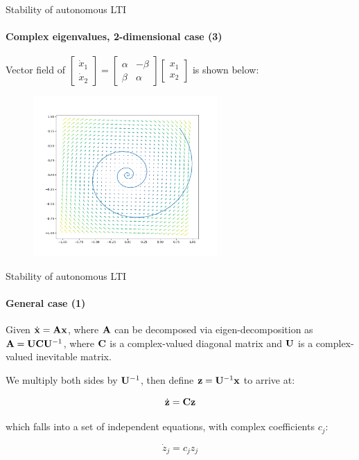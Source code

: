 \documentclass{beamer}
\begin{document}
\begin{frame}{Stability of autonomous LTI}
\framesubtitle{Complex eigenvalues, 2-dimensional case (3)}
\begin{flushleft}

Vector field of 
$\begin{bmatrix}
    \dot{x}_1 \\ \dot{x}_2
\end{bmatrix} 
=
\begin{bmatrix}
    \alpha & -\beta \\ \beta & \alpha
\end{bmatrix}     
\begin{bmatrix}
    x_1 \\ x_2
\end{bmatrix} $ 
is shown below:
%
\begin{figure}
    \centering
    \includegraphics[width=7cm]{Figure_1.png}%
    \label{fig:my_label}
\end{figure}

\end{flushleft}
\end{frame}



\begin{frame}{Stability of autonomous LTI}
\framesubtitle{General case (1)}
\begin{flushleft}

Given $\dot{\mathbf{x}} = \mathbf{A} \mathbf{x}$, where $\mathbf{A}$ can be decomposed via eigen-decomposition as $\mathbf{A} = \mathbf{U} \mathbf{C} \mathbf{U}^{-1}$, where $\mathbf{C}$ is a complex-valued diagonal matrix and $\mathbf{U}$ is a complex-valued inevitable matrix. 

\bigskip

We multiply both sides by $\mathbf{U}^{-1}$, then define $\mathbf{z} = \mathbf{U}^{-1} \mathbf{x}$ to arrive at:

\begin{equation}
    \dot{\mathbf{z}} = \mathbf{C} \mathbf{z}
\end{equation}

which falls into a set of independent equations, with complex coefficients $c_j$:

\begin{equation}
    \dot{z}_j = c_j z_j
\end{equation}

\end{flushleft}
\end{frame}
\end{document}
